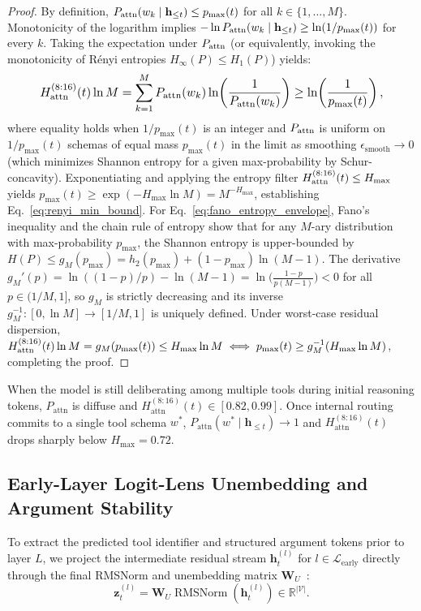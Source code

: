 \documentclass[10pt,conference]{IEEEtran}
\begin{document}
\begin{proof}
By definition, $P_{\textnormal{attn}}(w_k \mid \mathbf{h}_{\le t}) \le p_{\max}(t)$ for all $k \in \{1,\dots,M\}$. Monotonicity of the logarithm implies $-\ln P_{\textnormal{attn}}(w_k \mid \mathbf{h}_{\le t}) \ge \ln(1 / p_{\max}(t))$ for every $k$. Taking the expectation under $P_{\textnormal{attn}}$ (or equivalently, invoking the monotonicity of R\'enyi entropies $H_\infty(P) \le H_1(P)$) yields:
\begin{equation}
\resizebox{0.88\columnwidth}{!}{$\displaystyle
H_{\textnormal{attn}}^{(8:16)}(t) \ln M = \sum_{k=1}^M P_{\textnormal{attn}}(w_k) \ln\!\left(\frac{1}{P_{\textnormal{attn}}(w_k)}\right) \ge \ln\!\left(\frac{1}{p_{\max}(t)}\right),
$}
\end{equation}
where equality holds when $1/p_{\max}(t)$ is an integer and $P_{\textnormal{attn}}$ is uniform on $1/p_{\max}(t)$ schemas of equal mass $p_{\max}(t)$ in the limit as smoothing $\epsilon_{\text{smooth}} \to 0$ (which minimizes Shannon entropy for a given max-probability by Schur-concavity). Exponentiating and applying the entropy filter $H_{\textnormal{attn}}^{(8:16)}(t) \le H_{\max}$ yields $p_{\max}(t) \ge \exp(-H_{\max} \ln M) = M^{-H_{\max}}$, establishing Eq.~\eqref{eq:renyi_min_bound}.
For Eq.~\eqref{eq:fano_entropy_envelope}, Fano's inequality and the chain rule of entropy show that for any $M$-ary distribution with max-probability $p_{\max}$, the Shannon entropy is upper-bounded by $H(P) \le g_M(p_{\max}) = h_2(p_{\max}) + (1 - p_{\max}) \ln(M-1)$. The derivative $g_M'(p) = \ln((1-p)/p) - \ln(M-1) = \ln\big(\frac{1-p}{p(M-1)}\big) < 0$ for all $p \in (1/M, 1]$, so $g_M$ is strictly decreasing and its inverse $g_M^{-1} : [0, \ln M] \to [1/M, 1]$ is uniquely defined. Under worst-case residual dispersion, $H_{\textnormal{attn}}^{(8:16)}(t) \ln M = g_M(p_{\max}(t)) \le H_{\max} \ln M \iff p_{\max}(t) \ge g_M^{-1}(H_{\max} \ln M)$, completing the proof.
\end{proof}

When the model is still deliberating among multiple tools during initial reasoning tokens, $P_{\text{attn}}$ is diffuse and $H_{\text{attn}}^{(8:16)}(t) \in [0.82, 0.99]$. Once internal routing commits to a single tool schema $w^*$, $P_{\text{attn}}(w^* \mid \mathbf{h}_{\le t}) \to 1$ and $H_{\text{attn}}^{(8:16)}(t)$ drops sharply below $H_{\max} = 0.72$.

\subsection{Early-Layer Logit-Lens Unembedding and Argument Stability}
To extract the predicted tool identifier and structured argument tokens prior to layer $L$, we project the intermediate residual stream $\mathbf{h}_t^{(l)}$ for $l \in \mathcal{L}_{\text{early}}$ directly through the final RMSNorm and unembedding matrix $\mathbf{W}_U$~\cite{nostalgebraist2020logitlens, belrose2023eliciting}:
\begin{equation}
\mathbf{z}_t^{(l)} = \mathbf{W}_U \operatorname{RMSNorm}\!\left(\mathbf{h}_t^{(l)}\right) \in \mathbb{R}^{|\mathcal{V}|}.
\label{eq:logit_lens}
\end{equation}
\end{document}
